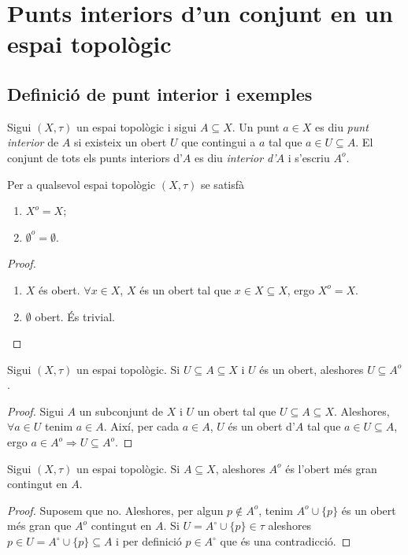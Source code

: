 \documentclass[../main.tex]{subfiles}
\begin{document}
\section{Punts interiors d'un conjunt en un espai topològic}

\subsection{Definició de punt interior i exemples}

\begin{defi}
\label{def:puntinterior} Sigui $(X,\tau)$ un espai topològic i sigui $A\subseteq X$. Un punt $a\in X$ es diu \textit{punt interior} de $A$ si existeix un obert $U$ que contingui a $a$ tal que $a\in U\subseteq A$. El conjunt de tots els punts interiors d'$A$ es diu \textit{interior d'$A$} i s'escriu $A^{o}$.
\end{defi}

\begin{nota}
Per a qualsevol espai topològic $(X,\tau)$ se satisfà
\begin{enumerate}[(1)]
    \item $X^{o} = X$;
    \item $\emptyset^{o}=\emptyset$.
\end{enumerate}
\end{nota}
\begin{proof}
\begin{enumerate}[(1)]
    \item $X$ és obert. $\forall x\in X$, $X$ és un obert tal que $x\in X\subseteq X$, ergo $X^{o} = X$.
    \item $\emptyset$ obert. És trivial.
\end{enumerate}
\end{proof}

\begin{prop}
\label{prop:interior1} Sigui $(X,\tau)$ un espai topològic. Si $U\subseteq A\subseteq X$ i $U$ és un obert, aleshores $U\subseteq A^{o}$.
\end{prop}
\begin{proof}
Sigui $A$ un subconjunt de $X$ i $U$ un obert tal que $U\subseteq A\subseteq X$. Aleshores, $\forall a\in U$ tenim $a\in A$. Així, per cada $a\in A$, $U$ és un obert d'$A$ tal que $a\in U\subseteq A$, ergo $a\in A^{o}\Rightarrow U\subseteq A^{o}$.
\end{proof}

\begin{prop}
\label{prop:interior2} Sigui $(X,\tau)$ un espai topològic. Si $A\subseteq X$, aleshores $A^{o}$ és l'obert més gran contingut en $A$.
\end{prop}
\begin{proof}
Suposem que no. Aleshores, per algun $p\not\in A^{o}$, tenim $A^{o}\cup \{p\}$ és un obert més gran que $A^{o}$ contingut en $A$. Si $U = A^\circ\cup\{p\}\in\tau$ aleshores $p\in U=A^\circ\cup\{p\}\subseteq A$ i per definició $p\in A^\circ$ que és una contradicció.
\end{proof}
\end{document}

